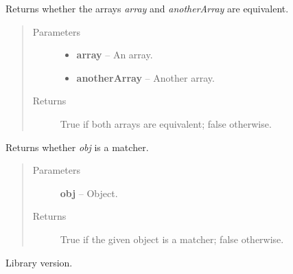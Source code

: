\documentclass[letterpaper,10pt,english]{sphinxmanual}
\begin{document}
\begin{fulllineitems}
\label{modules/jshamcrest:JsHamcrest.areArraysEqual}
Returns whether the arrays \emph{array} and \emph{anotherArray} are equivalent.
\begin{quote}\begin{description}
\item[{Parameters}] \leavevmode\begin{itemize}
\item {} 
\textbf{array} -- An array.

\item {} 
\textbf{anotherArray} -- Another array.

\end{itemize}

\item[{Returns}] \leavevmode
True if both arrays are equivalent; false otherwise.

\end{description}\end{quote}

\end{fulllineitems}


\begin{fulllineitems}
\label{modules/jshamcrest:JsHamcrest.isMatcher}
Returns whether \emph{obj} is a matcher.
\begin{quote}\begin{description}
\item[{Parameters}] \leavevmode
\textbf{obj} -- Object.

\item[{Returns}] \leavevmode
True if the given object is a matcher; false otherwise.

\end{description}\end{quote}

\end{fulllineitems}


\begin{fulllineitems}
\label{modules/jshamcrest:JsHamcrest.version}
Library version.

\end{fulllineitems}
\end{document}
